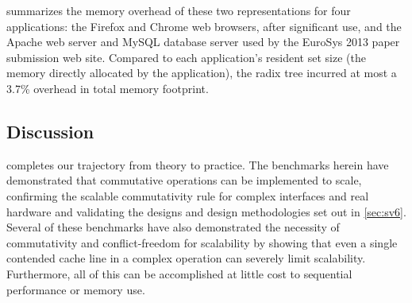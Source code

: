  summarizes the memory overhead of these two
representations for four applications: the Firefox and Chrome web
browsers, after significant use, and the Apache web server and MySQL
database server used by the EuroSys 2013 paper submission web site.
%
Compared to each application's resident set size (the memory directly
allocated by the application), the radix tree incurred at most a
3.7\% overhead in total memory footprint.


\subsection{Discussion}

 completes our trajectory from theory to practice.
%
The benchmarks herein have demonstrated that commutative operations
can be implemented to scale, confirming the scalable commutativity
rule for complex interfaces and real hardware and validating the
designs and design methodologies set out in \cref{sec:sv6}.
%
Several of these benchmarks have also demonstrated the necessity of
commutativity and conflict-freedom for scalability by showing that
even a single contended cache line in a complex operation can severely
limit scalability.
%
Furthermore, all of this can be accomplished at little cost to
sequential performance or memory use.

